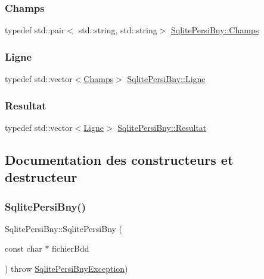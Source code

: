 \subsubsection{\texorpdfstring{Champs}{Champs}}
{\footnotesize\ttfamily typedef std\+::pair$<$ std\+::string, std\+::string$>$ \hyperlink{classSqlitePersiBny_af3de7ea7bd4146b4ce0a00ceae01befd}{Sqlite\+Persi\+Bny\+::\+Champs}}

\mbox{\label{classSqlitePersiBny_a32400b54d9a08cae7d60d985a5d48892}} 
\subsubsection{\texorpdfstring{Ligne}{Ligne}}
{\footnotesize\ttfamily typedef std\+::vector$<$\hyperlink{classSqlitePersiBny_af3de7ea7bd4146b4ce0a00ceae01befd}{Champs}$>$ \hyperlink{classSqlitePersiBny_a32400b54d9a08cae7d60d985a5d48892}{Sqlite\+Persi\+Bny\+::\+Ligne}}

\mbox{\label{classSqlitePersiBny_a04bdd1bacd9241210ea44ec2c072f79b}} 
\subsubsection{\texorpdfstring{Resultat}{Resultat}}
{\footnotesize\ttfamily typedef std\+::vector$<$\hyperlink{classSqlitePersiBny_a32400b54d9a08cae7d60d985a5d48892}{Ligne}$>$ \hyperlink{classSqlitePersiBny_a04bdd1bacd9241210ea44ec2c072f79b}{Sqlite\+Persi\+Bny\+::\+Resultat}}



\subsection{Documentation des constructeurs et destructeur}
\mbox{\label{classSqlitePersiBny_af4ff22e110cfc9ad07460e2aedb9d884}} 
\subsubsection{\texorpdfstring{Sqlite\+Persi\+Bny()}{SqlitePersiBny()}}
{\footnotesize\ttfamily Sqlite\+Persi\+Bny\+::\+Sqlite\+Persi\+Bny (\begin{DoxyParamCaption}\item[{const char $\ast$}]{fichier\+Bdd }\end{DoxyParamCaption}) throw  \hyperlink{classSqlitePersiBnyException}{Sqlite\+Persi\+Bny\+Exception}) }

